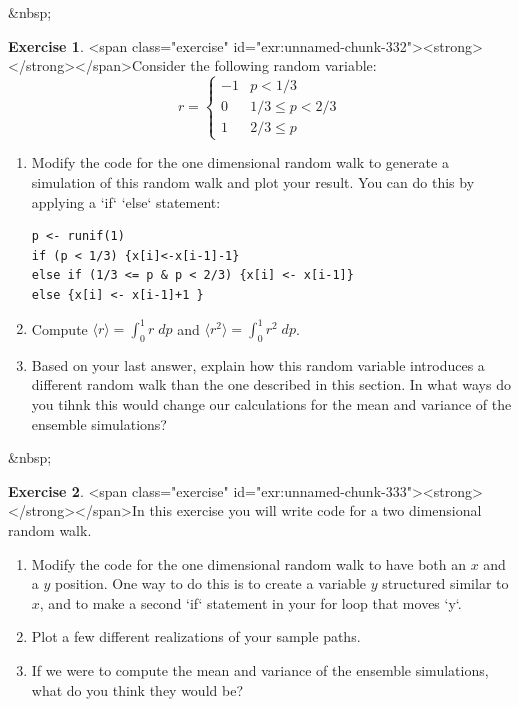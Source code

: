 \documentclass[
]{book}
\theoremstyle{definition}
\theoremstyle{definition}
\theoremstyle{definition}
\newtheorem{exercise}{Exercise}[chapter]
\theoremstyle{remark}
\begin{document}
&nbsp;

\begin{exercise}
<span class="exercise" id="exr:unnamed-chunk-332"><strong>\label{exr:unnamed-chunk-332} </strong></span>Consider the following random variable:
\begin{equation}
r=
\begin{cases}
-1 & p < 1/3 \\
0 & 1/3 \leq p < 2/3\\
1 & 2/3 \leq p
\end{cases}
\end{equation}

\begin{enumerate}[label=\alph*.]
\item Modify the code for the one dimensional random walk to generate a simulation of this random walk and plot your result.  You can do this by applying a `if` `else` statement:
  
\begin{verbatim}
p <- runif(1)
if (p < 1/3) {x[i]<-x[i-1]-1}
else if (1/3 <= p & p < 2/3) {x[i] <- x[i-1]}
else {x[i] <- x[i-1]+1 }
\end{verbatim}
\item Compute $\displaystyle \langle r \rangle = \int_{0}^{1} r \; dp$ and $\displaystyle \langle r^{2} \rangle = \int_{0}^{1} r^{2} \; dp$.
\item Based on your last answer, explain how this random variable introduces a different random walk than the one described in this section. In what ways do you tihnk this would change our calculations for the mean and variance of the ensemble simulations?
  \end{enumerate}
\end{exercise}
&nbsp;
 
\begin{exercise}
<span class="exercise" id="exr:unnamed-chunk-333"><strong>\label{exr:unnamed-chunk-333} </strong></span>In this exercise you will write code for a two dimensional random walk.

\begin{enumerate}[label=\alph*.]
\item Modify the code for the one dimensional random walk to have both an $x$ and a $y$ position.  One way to do this is to create a variable $y$ structured similar to $x$, and to make a second `if` statement in your for loop that moves `y`.
\item Plot a few different realizations of your sample paths.
\item If we were to compute the mean and variance of the ensemble simulations, what do you think they would be?
\end{enumerate}
\end{exercise}
\end{document}
